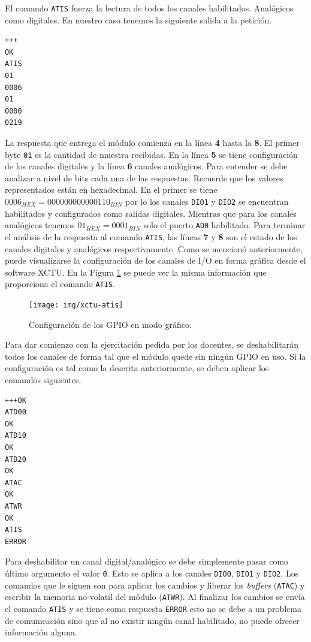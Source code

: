 \documentclass[11pt,oneside,spanish,a4paper]{article}
\begin{document}
El comando \texttt{ATIS} fuerza la lectura de todos los canales
habilitados. Analógicos como digitales. En nuestro caso tenemos la
siguiente salida a la petición.

\begin{lstlisting}[emph={+++,ATIS}, emphstyle={\color{blue}}]
+++
OK
ATIS
01
0006
01
0000
0219
\end{lstlisting}

La respuesta que entrega el módulo comienza en la línea \textbf{4}
hasta la \textbf{8}. El primer byte \texttt{01} es la cantidad de
muestra recibidas. En la línea \textbf{5} se tiene configuración de
los canales digitales y la línea \textbf{6} canales analógicos. Para
entender se debe analizar a nivel de bits cada una de las
respuestas. Recuerde que los valores representados están en
hexadecimal. En el primer se tiene $0006_{HEX} =
000000000000110_{BIN}$ por lo los canales \texttt{DIO1} y
\texttt{DIO2} se encuentran habilitados y configurados como salidas
digitales. Mientras que para los canales analógicos tenemos
$01_{HEX} = 0001_{BIN}$ solo el puerto \texttt{AD0} habilitado. Para
terminar el análisis de la respuesta al comando \texttt{ATIS}, las
líneas \textbf{7} y \textbf{8} son el estado de los canales
digitales y analógicos respectivamente. Como se mencionó
anteriormente, puede visualizarse la configuración de los canales de
I/O en forma gráfica desde el software XCTU. En la Figura
\ref{fig:xctu-setup} se puede ver la misma información que
proporciona el comando \texttt{ATIS}.

\begin{figure}[h]
  \centering
  \texttt{[image: img/xctu-atis]}
  \caption{Configuración de los GPIO en modo gráfico.}
  \label{fig:xctu-setup}
\end{figure}

Para dar comienzo con la ejercitación pedida por los docentes, se
deshabilitarán todos los canales de forma tal que el módulo quede sin
ningún GPIO en uso. Sí la configuración es tal como la descrita
anteriormente, se deben aplicar los comandos siguientes.

\noindent\begin{minipage}{.25\textwidth}
\begin{lstlisting}[emph={+++,ATIS,ATD00,ATD10,ATD20,ATWR,ATAC}, emphstyle={\color{blue}}]
+++OK
ATD00
OK
ATD10
OK
ATD20
OK
ATAC
OK
ATWR
OK
ATIS
ERROR
\end{lstlisting}
\end{minipage} \hfill
\begin{minipage}{.70\textwidth}
Para deshabilitar un canal digital/analógico se debe simplemente pasar
como último argumento el valor \texttt{0}. Esto se aplica a los
canales \texttt{DIO0}, \texttt{DIO1} y \texttt{DIO2}. Los comandos que
le siguen son para aplicar los cambios y liberar los \textsl{buffers}
(\texttt{ATAC}) y  escribir la
memoria no-volatil del módulo (\texttt{ATWR}). Al finalizar los
cambios se envía el comando \texttt{ATIS} y se tiene como respuesta
\texttt{ERROR} esto no se debe a un problema de comunicación sino que
al no existir ningún canal habilitado, no puede ofrecer información
alguna. 
\end{minipage}
\end{document}
